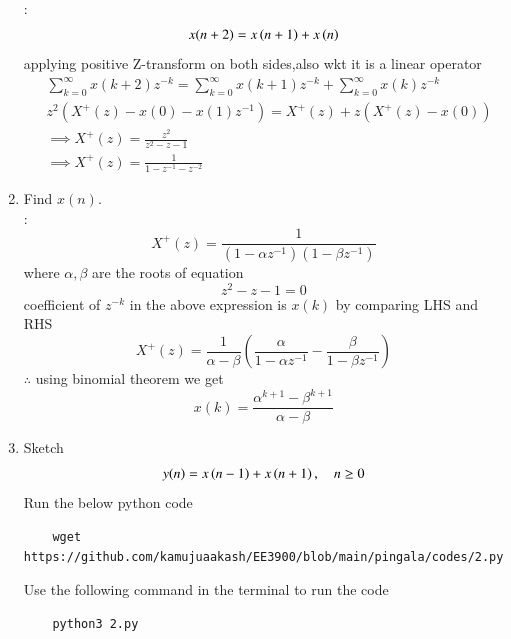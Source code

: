 \documentclass[journal,12pt,twocolumn]{IEEEtran}
\renewcommand\thesection{\arabic{section}}
\begin{document}
\begin{enumerate}[label=\thesection.\arabic*,ref=\thesection.\theenumi]
\solution:
\begin{align}
	x(n+2) = x\left(n+1\right) + x\left(n\right)
\end{align}
applying positive Z-transform on both sides,also wkt it is a linear operator
\begin{align}
	&\sum_{k=0}^{\infty}x(k+2)z^{-k}=\sum_{k=0}^{\infty}x(k+1)z^{-k}+\sum_{k=0}^{\infty}x(k)z^{-k}\\
	&z^{2}(X^{+}(z)-x(0)-x(1)z^{-1})=X^{+}(z)+z(X^{+}(z)-x(0))\\
	&\implies X^{+}(z)=\frac{z^{2}}{z^{2}-z-1}\\
	&\implies X^{+}(z)=\frac{1}{1-z^{-1}-z^{-2}}
\end{align}
\item Find $x(n)$.\\
\solution:
\begin{equation}
	X^{+}(z)=\frac{1}{(1-\alpha z^{-1})(1-\beta z^{-1})}
\end{equation}
where $\alpha,\beta$ are the roots of equation
\begin{equation}
	z^2-z-1=0
\end{equation}
coefficient of $z^{-k}$ in the above expression is $x(k)$ by comparing LHS and RHS\\
\begin{equation}
	X^{+}(z)=\frac{1}{\alpha-\beta}\left(\frac{\alpha}{1-\alpha z^{-1}}-\frac{\beta}{1-\beta z^{-1}}\right)
\end{equation}
$\therefore$ using binomial theorem we get
\begin{equation} 
	x(k)=\frac{\alpha^{k+1}-\beta^{k+1}}{\alpha - \beta}
\end{equation}
\item Sketch 
\begin{align}
	y(n)	 = x\left(n-1\right) + x\left(n+1\right),  \quad n \ge 0
\end{align}
\solution
Run the below python code 
\begin{lstlisting}
	wget https://github.com/kamujuaakash/EE3900/blob/main/pingala/codes/2.py
\end{lstlisting}
Use the following command in the terminal to run the code
\begin{lstlisting}
	python3 2.py
\end{lstlisting}
\begin{figure}[h]
	\centering

\end{figure}
\end{enumerate}
\end{document}
